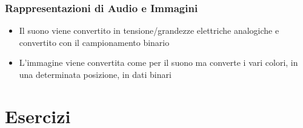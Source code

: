 \documentclass[a4paper,12pt, oneside]{book}
\begin{document}
\subsubsection{Rappresentazioni di Audio e Immagini}
\begin{itemize}
	\item Il suono viene convertito in tensione/grandezze elettriche analogiche e convertito con il campionamento binario
	\item L'immagine viene convertita come per il suono ma converte i vari colori, in una determinata posizione, in dati binari
\end{itemize}
\newpage
\section{Esercizi}
\end{document}

